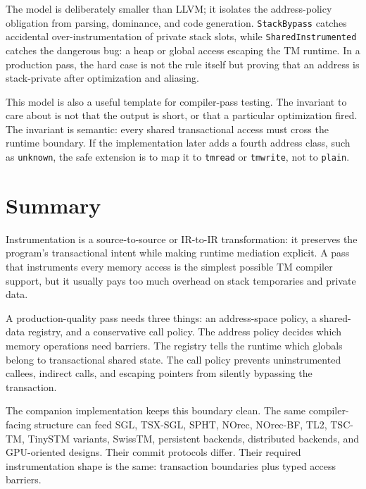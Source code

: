 The model is deliberately smaller than LLVM; it isolates the address-policy
obligation from parsing, dominance, and code generation. \texttt{StackBypass}
catches accidental over-instrumentation of private stack slots, while
\texttt{SharedInstrumented} catches the dangerous bug: a heap or global access
escaping the TM runtime. In a production pass, the hard case is not the rule
itself but proving that an address is stack-private after optimization and
aliasing.

This model is also a useful template for compiler-pass testing. The invariant to care about is not that the output is short, or that a particular optimization fired. The invariant is semantic: every shared transactional access must cross the runtime boundary. If the implementation later adds a fourth address class, such as \texttt{unknown}, the safe extension is to map it to \texttt{tmread} or \texttt{tmwrite}, not to \texttt{plain}.

\section{Summary}

Instrumentation is a source-to-source or IR-to-IR transformation: it preserves the program's transactional intent while making runtime mediation explicit. A pass that instruments every memory access is the simplest possible TM compiler support, but it usually pays too much overhead on stack temporaries and private data.

A production-quality pass needs three things: an address-space policy, a shared-data registry, and a conservative call policy. The address policy decides which memory operations need barriers. The registry tells the runtime which globals belong to transactional shared state. The call policy prevents uninstrumented callees, indirect calls, and escaping pointers from silently bypassing the transaction.

The companion implementation keeps this boundary clean. The same compiler-facing structure can feed SGL, TSX-SGL, SPHT, NOrec, NOrec-BF, TL2, TSC-TM, TinySTM variants, SwissTM, persistent backends, distributed backends, and GPU-oriented designs. Their commit protocols differ. Their required instrumentation shape is the same: transaction boundaries plus typed access barriers.

